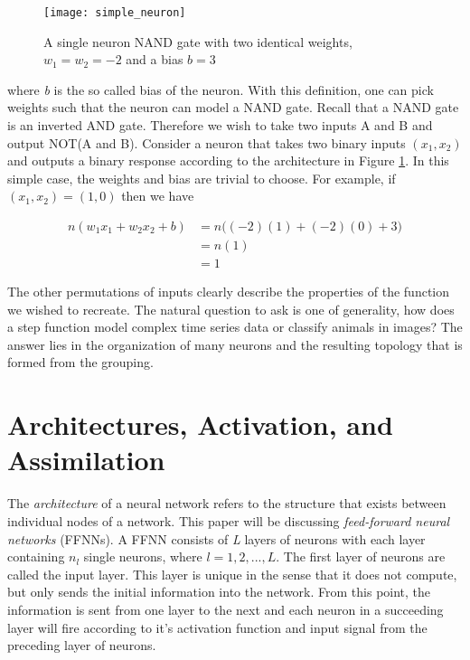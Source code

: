 \begin{figure}
\centering
\texttt{[image: simple\_neuron]}
\caption{A single neuron NAND gate with two identical weights, $w_1 = w_2 = -2$ and a bias $b = 3$}
\label{fig:simple_neuron}
\end{figure}

\noindent where \textit{b} is the so called bias of the neuron. With this definition, one can pick weights such that the neuron can model a NAND gate. Recall that a NAND gate is an inverted AND gate. Therefore we wish to take two inputs A and B and output NOT(A and B). Consider a neuron that takes two binary inputs $(x_1,x_2)$ and outputs a binary response according to the architecture in Figure \ref{fig:simple_neuron}. In this simple case, the weights and bias are trivial to choose. For example, if $(x_1,x_2)=(1,0)$ then we have

\begin{align*}
n\left(w_1x_1 + w_2x_2 + b\right) & = n\Big((-2)(1) + (-2)(0) + 3\Big) \\
& = n(1) \\
& = 1
\end{align*}

\noindent The other permutations of inputs clearly describe the properties of the function we wished to recreate. The natural question to ask is one of generality, how does a step function model complex time series data or classify animals in images? The answer lies in the organization of  many neurons and the resulting topology that is formed from the grouping.

\section{Architectures, Activation, and Assimilation}
\label{sec: three_As}

The \textit{architecture} of a neural network refers to the structure that exists between individual nodes of a network. This paper will be discussing \textit{feed-forward neural networks} (FFNNs). A FFNN consists of \textit{L} layers of neurons with each layer containing $n_l$ single neurons, where $l=1, 2, ..., L$. The first layer of neurons are called the input layer. This layer is unique in the sense that it does not compute, but only sends the initial information into the network. From this point, the information is sent from one layer to the next and each neuron in a succeeding layer will fire according to it's activation function and input signal from the preceding layer of neurons.

